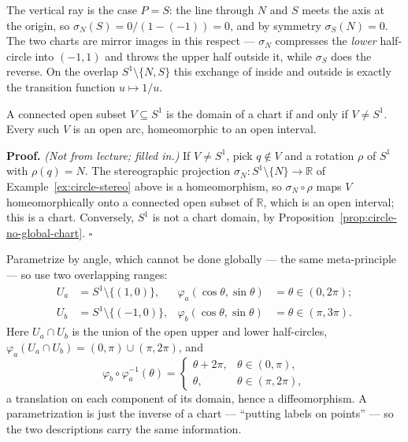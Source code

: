 \documentclass[11pt]{report}
\makeatletter
\newcounter{thmcounter}[section]
\newcounter{excounter}[section]
\renewenvironment{proof}[1][Proof]{\noindent\textbf{#1.} }{\hfill$\square$\par\vspace{5pt}}
\newcommand{\thmlabel}[1]{\edef\@currentlabel{\arabic{section}.\arabic{thmcounter}}\label{#1}}
\newcommand{\exlabel}[1]{\edef\@currentlabel{\arabic{section}.\arabic{excounter}}\label{#1}}
\makeatother
\begin{document}
The vertical ray is the case $P = S$: the line through $N$ and $S$ meets the axis at the origin, so $\sigma_N(S) = 0/(1-(-1)) = 0$, and by symmetry $\sigma_S(N) = 0$. The two charts are mirror images in this respect --- $\sigma_N$ compresses the \emph{lower} half-circle into $(-1,1)$ and throws the upper half outside it, while $\sigma_S$ does the reverse. On the overlap $S^1 \setminus \{N,S\}$ this exchange of inside and outside is exactly the transition function $u \mapsto 1/u$.


\begin{propbox}\thmlabel{prop:circle-chart-domains}
A connected open subset $V \subseteq S^1$ is the domain of a chart if and only if $V \ne S^1$. Every such $V$ is an open arc, homeomorphic to an open interval.
\end{propbox}

\begin{proof}
\textit{(Not from lecture; filled in.)} If $V \ne S^1$, pick $q \notin V$ and a rotation $\rho$ of $S^1$ with $\rho(q) = N$. The stereographic projection $\sigma_N : S^1 \setminus \{N\} \to \mathbb{R}$ of Example~\ref{ex:circle-stereo} above is a homeomorphism, so $\sigma_N \circ \rho$ maps $V$ homeomorphically onto a connected open subset of $\mathbb{R}$, which is an open interval; this is a chart. Conversely, $S^1$ is not a chart domain, by Proposition~\ref{prop:circle-no-global-chart}.
\end{proof}
\begin{exbox}\exlabel{ex:circle-angle}
Parametrize by angle, which cannot be done globally --- the same meta-principle --- so use two overlapping ranges:
\[
\begin{aligned}
U_a &= S^1 \setminus \{(1,0)\}, & \varphi_a(\cos\theta, \sin\theta) &= \theta \in (0, 2\pi); \\
U_b &= S^1 \setminus \{(-1,0)\}, & \varphi_b(\cos\theta, \sin\theta) &= \theta \in (\pi, 3\pi).
\end{aligned}
\]
Here $U_a \cap U_b$ is the union of the open upper and lower half-circles, $\varphi_a(U_a \cap U_b) = (0,\pi) \cup (\pi, 2\pi)$, and
\[
\varphi_b \circ \varphi_a^{-1}(\theta) = \begin{cases} \theta + 2\pi, & \theta \in (0,\pi), \\ \theta, & \theta \in (\pi, 2\pi), \end{cases}
\]
a translation on each component of its domain, hence a diffeomorphism. A parametrization is just the inverse of a chart --- ``putting labels on points'' --- so the two descriptions carry the same information.
\end{exbox}
\end{document}

